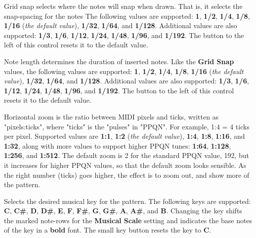    Grid snap selects where the notes will snap when drawn.
   That is, it selects the snap-spacing for the notes
   The following values are supported:
   \textbf{1}, \textbf{1/2}, \textbf{1/4}, \textbf{1/8},
   \textbf{1/16} (\textsl{the default value}),
   \textbf{1/32}, \textbf{1/64}, and \textbf{1/128}.
   Additional values are also supported:
   \textbf{1/3}, \textbf{1/6}, \textbf{1/12}, \textbf{1/24},
   \textbf{1/48}, \textbf{1/96}, and \textbf{1/192}.
   The button to the left of this control resets it to the default value.

   Note length determines the duration of inserted notes.
   Like the \textbf{Grid Snap} values,
   the following values are supported:
   \textbf{1}, \textbf{1/2}, \textbf{1/4}, \textbf{1/8},
   \textbf{1/16} (\textsl{the default value}),
   \textbf{1/32}, \textbf{1/64}, and \textbf{1/128}.
   Additional values are also supported:
   \textbf{1/3}, \textbf{1/6}, \textbf{1/12}, \textbf{1/24},
   \textbf{1/48}, \textbf{1/96}, and \textbf{1/192}.
   The button to the left of this control resets it to the default value.

   Horizontal zoom is the ratio between MIDI pixels and ticks, written as
   "pixels:ticks", where "ticks" is the "pulses" in "PPQN".
   For example, 1:4 = 4 ticks per pixel.
   Supported values are
   \textbf{1:1}, \textbf{1:2} (\textsl{the default value}),
   \textbf{1:4}, \textbf{1:8}, \textbf{1:16},
   and \textbf{1:32}, along with
   more values to support higher PPQN tunes:
   \textbf{1:64}, \textbf{1:128}, \textbf{1:256}, and \textbf{1:512}.
   The default zoom is 2 for the standard PPQN value, 192, but it
   increases for higher PPQN values, so that the default zoom looks sensible.
   As the right number (ticks) goes higher,
   the effect is to zoom out, and show more of the pattern.

   Selects the desired musical key for the pattern.  The following keys are
   supported:
   \textbf{C}, \textbf{C\#},
   \textbf{D}, \textbf{D\#},
   \textbf{E}, \textbf{F}, \textbf{F\#},
   \textbf{G}, \textbf{G\#},
   \textbf{A}, \textbf{A\#},
   and \textbf{B}.
   Changing the key shifts the marked note-rows
   for the \textbf{Musical Scale} setting and indicates the base notes
   of the key in a \textbf{bold} font.
   The small key button resets the key to \textbf{C}.

